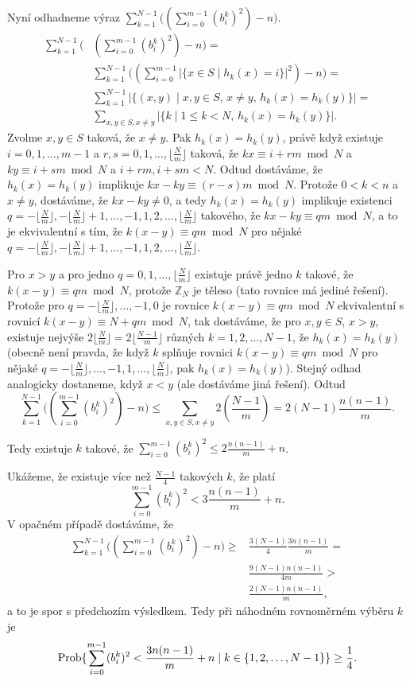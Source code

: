 \documentclass[a4paper,12pt]{article}
\begin{document}
Nyní odhadneme výraz $\sum_{k=1}^{N-1}\big((\sum_{
i=0}^{m-1}(b_i^k)^2)-n\big)$.
\begin{align*}\sum_{k=1}^{N-1}\big(&(\sum_{i=0}^{m-1}(b_i^k)^2)-n\big)=\\
&\sum_{k=1}^{N-1}\big((\sum_{i=0}^{m-1}|\{x\in S\mid h_k(x)=i\}|^
2)-n\big)=\\
&\sum_{k=1}^{N-1}|\{(x,y)\mid x,y\in S,\,x\ne y,\,h_k(x)=h_k(y)\}
|=\\
&\sum_{x,y\in S,x\ne y}|\{k\mid 1\le k<N,\,h_k(x)=h_k(y)\}|.\end{align*}
Zvolme $x,y\in S$ taková, že $x\ne y$. Pak $h_k(x)=h_k(y)$, 
právě když existuje $i=0,1,\dots,m-1$ a $r,s=0,1,\dots,\lfloor\frac 
Nm\rfloor$ 
taková, že $kx\equiv i+rm\bmod N$ a $ky\equiv i+sm\bmod N$ a $
i+rm,i+sm<N$. Odtud dostáváme, že $h_k(x)=h_k(y)$ implikuje $
kx-ky\equiv (r-s)m\bmod N$.
Protože $0<k<n$ a $x\ne y$, dostáváme, že $kx-ky\ne 0$, a tedy 
$h_k(x)=h_k(y)$ implikuje existenci 
$q=-\lfloor\frac Nm\rfloor ,-\lfloor\frac Nm\rfloor +1,\dots,-1,1
,2,\dots,\lfloor\frac Nm\rfloor$ takového, že 
$kx-ky\equiv qm\bmod N$,
a to je 
ekvivalentní s tím, že $k(x-y)\equiv qm\bmod N$ pro nějaké 
$q=-\lfloor\frac Nm\rfloor ,-\lfloor\frac Nm\rfloor +1,\dots,-1,1
,2,\dots,\lfloor\frac Nm\rfloor$.

Pro $x>y$ a pro jedno $q=0,1,\dots,\lfloor\frac Nm\rfloor$ e\-xis\-tuje 
právě jedno $k$ takové, že $k(x-y)\equiv qm\bmod N$, protože 
$\mathbb Z_N$ je těleso (tato rovnice má jediné řešení). 
Protože pro $q=-\lfloor\frac Nm\rfloor ,\dots,-1,0$ je rovnice $
k(x-y)\equiv qm\bmod N$ 
ekvivalentní s rovnicí $k(x-y)\equiv N+qm\bmod N$, tak 
dostáváme, že pro $x,y\in S$, $x>y$, existuje nejvýše 
$2\lfloor\frac Nm\rfloor =2\lfloor\frac {N-1}m\rfloor$ různých $
k=1,2,\dots,N-1$, že $h_k(x)=h_k(y)$ (obecně není pravda, že když 
$k$ splňuje rovnici $k(x-y)\equiv qm\bmod N$ pro nějaké 
$q=-\lfloor\frac Nm\rfloor ,\dots,-1,1,\dots,\lfloor\frac Nm\rfloor$, 
pak $h_k(x)=h_k(y)$). Stejný odhad analogicky dostaneme, když $
x<y$ 
(ale dostáváme jiná řešení). Odtud 
$$\sum_{k=1}^{N-1}\big((\sum_{i=0}^{m-1}(b_i^k)^2)-n\big)\le\sum_{
x,y\in S,x\ne y}2(\frac {N-1}m)=2(N-1)\frac {n(n-1)}m.$$

Tedy existuje $k$ takové, že $\sum_{i=0}^{m-1}(b_i^
k)^2\le 2\frac {n(n-1)}m+n$. 

Ukážeme, že existuje více než $\frac {N-
1}4$ takových 
$k$, že platí
$$\sum_{i=0}^{m-1}(b_i^k)^2<3\frac {n(n-1)}m+n.$$
V opačném případě dostáváme, že 
\begin{align*}\sum_{k=1}^{N-1}\big((\sum_{i=0}^{m-1}(b_i^k)^2)-n\big)\ge&\frac {
3(N-1)}4\frac {3n(n-1)}m=\\
&\frac {9(N-1)n(n-1)}{4m}>\\
&\frac {2(N-1)n(n-1)}m,\end{align*}
a to je spor s předchozím výsledkem. Tedy při náhodném rovnoměrném 
výběru $k$ je 
$$\operatorname{Prob}\{\sum_{i=0}^{m-1}(b_i^k)^2<\frac {3n(n-1)}m+n\mid k\in \{
1,2,\dots,N-1\}\}\ge\frac 14.$$
\end{document}

